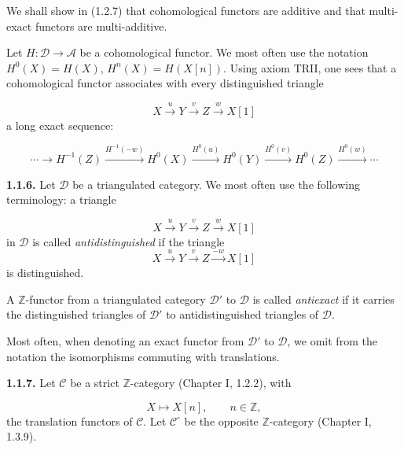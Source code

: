 %
\begingroup
\small
\setlength{\abovedisplayskip}{4pt plus 2pt minus 2pt}%
\setlength{\belowdisplayskip}{4pt plus 2pt minus 2pt}%

\noindent We shall show in (1.2.7) that cohomological functors are
additive and that multi-exact functors are multi-additive.

Let $H\colon\mathcal D\longrightarrow\mathcal A$ be a cohomological
functor. We most often use the notation $H^0(X)=H(X)$,
$H^n(X)=H(X[n])$. Using axiom TRII, one sees that a cohomological functor
associates with every distinguished triangle

\[
  X\xrightarrow{u}Y\xrightarrow{v}Z\xrightarrow{w}X[1]
\]
a long exact sequence:

\begin{equation}
  \cdots\longrightarrow H^{-1}(Z)
  \xrightarrow{H^{-1}(-w)}H^0(X)
  \xrightarrow{H^0(u)}H^0(Y)
  \xrightarrow{H^0(v)}H^0(Z)
  \xrightarrow{H^0(w)}\cdots
  \tag{1.1.5.1}
\end{equation}

\medskip
\noindent\textbf{1.1.6.}\quad
Let $\mathcal D$ be a triangulated category. We most often use the
following terminology: a triangle

\[
  X\xrightarrow{u}Y\xrightarrow{v}Z\xrightarrow{w}X[1]
\]
in $\mathcal D$ is called \emph{antidistinguished} if the triangle
\[
  X\xrightarrow{u}Y\xrightarrow{v}Z\xrightarrow{-w}X[1]
\]
is distinguished.

A $\mathbb Z$-functor from a triangulated category $\mathcal D'$ to
$\mathcal D$ is called \emph{antiexact} if it carries the distinguished
triangles of $\mathcal D'$ to antidistinguished triangles of $\mathcal D$.

Most often, when denoting an exact functor from $\mathcal D'$ to
$\mathcal D$, we omit from the notation the isomorphisms commuting with
translations.

\medskip
\noindent\textbf{1.1.7.}\quad
Let $\mathcal C$ be a strict $\mathbb Z$-category (Chapter I, 1.2.2),
with

\[
  X\longmapsto X[n],\qquad n\in\mathbb Z,
\]
the translation functors of $\mathcal C$. Let $\mathcal C^\circ$ be the
opposite $\mathbb Z$-category (Chapter I, 1.3.9).

